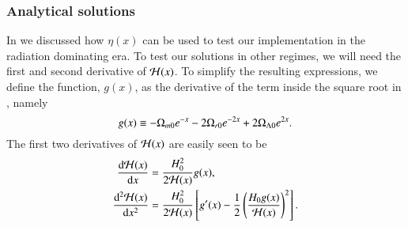 \subsubsection{Analytical solutions} \label{subsec:M1:theory:analytical_solutions}
In  we discussed how $\eta(x)$ can be used to test our implementation in the radiation dominating era. To test our solutions in other regimes, we will need the first and second derivative of $\mathcal{H}(x)$. To simplify the resulting expressions, we define the function, $g(x)$, as the derivative of the term inside the square root in , namely 
\begin{equation}
    g(x) \equiv -\Omega_{m0} e^{-x} -2\Omega_{r0} e^{-2x} + 2\Omega_{\Lambda 0} e^{2x}. \label{eq:M1:theory:g_of_x} 
\end{equation} 
%
The first two derivatives of $\mathcal{H}(x)$ are easily seen to be   
\begin{align} 
    \dv{\mathcal{H}(x)}{x} &= \frac{H_0^2}{2\mathcal{H}(x)}g(x), \label{eq:M1:theory:dHp_dx} \\
    \dv[2]{\mathcal{H}(x)}{x} &= \frac{H_0^2}{2\mathcal{H}(x)}\left[ g'(x) - \frac{1}{2}\left( \frac{H_0 g(x)}{\mathcal{H}(x)} \right)^2 \right]. \label{eq:M1:theory:ddHp_ddx}
\end{align}
%

